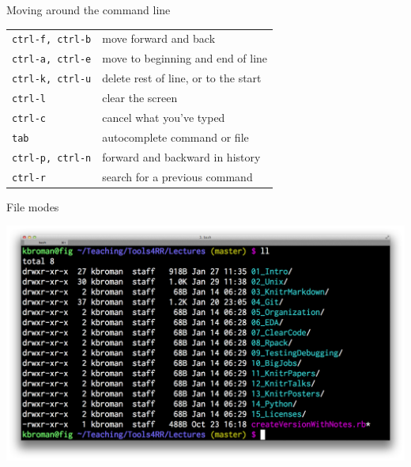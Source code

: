 \documentclass[12pt,t]{beamer}
\begin{document}
\begin{frame}[c]{Moving around the command line}

\renewcommand{\arraystretch}{1.3}
\begin{tabular}{ll}
{\tt ctrl-f, ctrl-b} & \color{lolit} move forward and back \\
{\tt ctrl-a, ctrl-e} & \color{lolit}  move to beginning and end of line \\
{\tt ctrl-k, ctrl-u} & \color{lolit}  delete rest of line, or to the start \\
{\tt ctrl-l} & \color{lolit}  clear the screen \\
{\tt ctrl-c} & \color{lolit}  cancel what you've typed \\
{\tt tab} & \color{lolit}  autocomplete command or file \\
{\tt ctrl-p, ctrl-n} & \color{lolit}  forward and backward in history \\
{\tt ctrl-r} & \color{lolit}  search for a previous command
\end{tabular}

\end{frame}



\begin{frame}[c]{File modes}

\centerline{\includegraphics[width=\textwidth]{Figs/chmod.png}}

\end{frame}
\end{document}
